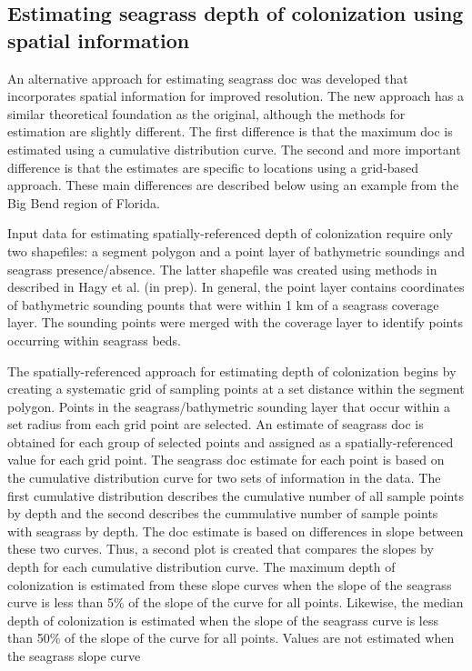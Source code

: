 \documentclass[letterpaper,12pt]{article}\usepackage[]{graphicx}\usepackage[]{color}
\begin{document}
\subsection{Estimating seagrass depth of colonization using spatial information}

An alternative approach for estimating seagrass \ac{doc} was developed that incorporates spatial information for improved resolution.  The new approach has a similar theoretical foundation as the original, although the methods for estimation are slightly different.  The first difference is that the maximum \ac{doc} is estimated using a cumulative distribution curve.  The second and more important difference is that the estimates are specific to locations using a grid-based approach.  These main differences are described below using an example from the Big Bend region of Florida.                                  

Input data for estimating spatially-referenced depth of colonization require only two shapefiles: a segment polygon and a point layer of bathymetric soundings and seagrass presence/absence.  The latter shapefile was created using methods in described in Hagy et al. (in prep).  In general, the point layer contains coordinates of bathymetric sounding pounts that were within 1 km of a seagrass coverage layer.  The sounding points were merged with the coverage layer to identify points occurring within seagrass beds.  

The spatially-referenced approach for estimating depth of colonization begins by creating a systematic grid of sampling points at a set distance within the segment polygon.  Points in the seagrass/bathymetric sounding layer that occur within a set radius from each grid point are selected.  An estimate of seagrass \ac{doc} is obtained for each group of selected points and assigned as a spatially-referenced value for each grid point.  The seagrass \ac{doc} estimate for each point is based on the cumulative distribution curve for two sets of information in the data.  The first cumulative distribution describes the cumulative number of all sample points by depth and the second describes the cummulative number of sample points with seagrass by depth.  The \ac{doc} estimate is based on differences in slope between these two curves.  Thus, a second plot is created that compares the slopes by depth for each cumulative distribution curve.  The maximum depth of colonization is estimated from these slope curves when the slope of the seagrass curve is less than 5\% of the slope of the curve for all points.  Likewise, the median depth of colonization is estimated when the slope of the seagrass curve is less than 50\% of the slope of the curve for all points.  Values are not estimated when the seagrass slope curve  
\end{document}

